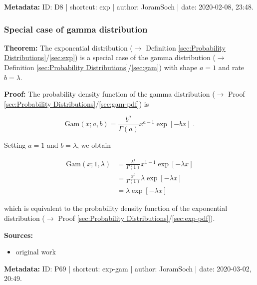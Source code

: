\documentclass[a4paper,12pt]{book}
\begin{document}
\vspace{1em}
\textbf{Metadata:} ID: D8 | shortcut: exp | author: JoramSoch | date: 2020-02-08, 23:48.


\subsubsection[\textbf{Special case of gamma distribution}]{Special case of gamma distribution} \label{sec:exp-gam}

\vspace{1em}
\textbf{Theorem:} The exponential distribution ($\rightarrow$ Definition \ref{sec:Probability Distributions}/\ref{sec:exp}) is a special case of the gamma distribution ($\rightarrow$ Definition \ref{sec:Probability Distributions}/\ref{sec:gam}) with shape $a = 1$ and rate $b = \lambda$.


\vspace{1em}
\textbf{Proof:} The probability density function of the gamma distribution ($\rightarrow$ Proof \ref{sec:Probability Distributions}/\ref{sec:gam-pdf}) is

\begin{equation} \label{eq:exp-gam-gam-pdf}
\mathrm{Gam}(x; a, b) = \frac{b^a}{\Gamma(a)} x^{a-1} \exp[-b x] \; .
\end{equation}

Setting $a = 1$ and $b = \lambda$, we obtain

\begin{equation} \label{eq:exp-gam-exp-pdf}
\begin{split}
\mathrm{Gam}(x; 1, \lambda) &= \frac{\lambda^1}{\Gamma(1)} x^{1-1} \exp[-\lambda x] \\
&= \frac{x^0}{\Gamma(1)} \lambda \exp[-\lambda x] \\
&= \lambda \exp[-\lambda x]
\end{split}
\end{equation}

which is equivalent to the probability density function of the exponential distribution ($\rightarrow$ Proof \ref{sec:Probability Distributions}/\ref{sec:exp-pdf}).

\vspace{1em}
\textbf{Sources:}
\begin{itemize}
\item original work\end{itemize}


\vspace{1em}
\textbf{Metadata:} ID: P69 | shortcut: exp-gam | author: JoramSoch | date: 2020-03-02, 20:49.
\end{document}
